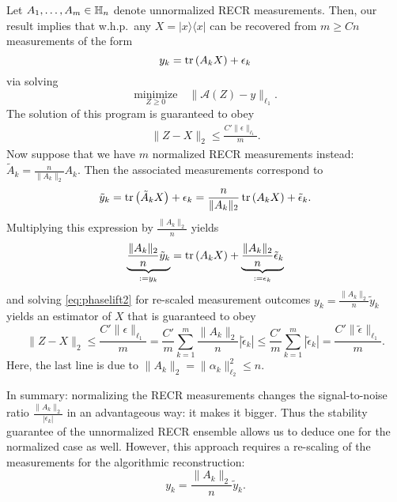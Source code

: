 Let $ A_1,\ldots, A_m \in \mathbb{H}_n$ denote unnormalized RECR measurements.
Then, our result implies that w.h.p.\ any $ X = | x \rangle \!\langle  x|$ can be recovered from $m \geq  C n$ measurements of the form
\begin{equation*}
  y_k = \operatorname{tr} \left(  A_k  X \right) + \epsilon_k
\end{equation*}
via solving
\begin{equation}
  \underset{ Z\geq 0}{\textrm{minimize}} \quad \| \mathcal{A}( Z) -  y \|_{\ell_1}. \label{eq:phaselift2}
\end{equation}
The solution of this program is guaranteed to obey
\begin{align*}
\|  Z -  X \|_2 \leq \frac{C' \| \epsilon \|_{\ell_1}}{m}.
\end{align*}
Now suppose that we have $m$ normalized RECR measurements instead: $\tilde{ A}_k = \frac{n}{\|  A_k \|_{2}}  A_k$. Then the associated measurements correspond to
\begin{equation*}
  \tilde{y}_k = \operatorname{tr} \left( \tilde{ A}_k X \right) + \epsilon_k = \frac{ n}{\|  A_k \|_2} \operatorname{tr} \left(  A_k X \right) + \tilde{\epsilon}_k.
\end{equation*}
Multiplying this expression by $\frac{\|  A_k \|_2}{n}$ yields
\begin{equation*}
\underset{:= y_k}{\underbrace{ \frac{ \|  A_k \|_2}{n}\tilde{y}_k}}
= \operatorname{tr} \left(  A_k X \right) + \underset{:= \epsilon_k}{\underbrace{ \frac{ \|  A_k \|_2}{n}\tilde{\epsilon}_k}}
\end{equation*}
and solving \eqref{eq:phaselift2} for re-scaled measurement outcomes $y_k = \frac{ \|  A_k \|_2}{n}\tilde{y}_k$ yields an estimator of $ X$ that is guaranteed to obey
\begin{equation*}
  \|  Z -  X \|_2 \leq \frac{C' \|  \epsilon \|_{\ell_1}}{m}
  = \frac{C'}{m} \sum_{k=1}^m \frac{ \|  A_k \|_2}{n} | \tilde{\epsilon}_k |
  \leq \frac{C'}{m} \sum_{k=1}^m | \tilde{\epsilon}_k| = \frac{C' \| \tilde{\epsilon} \|_{\ell_1}}{m}.
\end{equation*}
Here, the last line is due to $\|  A_k \|_2 = \| \alpha_k \|_{\ell_2}^2 \leq n$.

In summary: normalizing the RECR measurements changes the signal-to-noise ratio $\frac{ \|  A_k \|_2}{| \epsilon_k|}$ in an advantageous way: it makes it bigger. Thus the stability guarantee of the unnormalized RECR ensemble allows us to deduce one for the normalized case as well. However, this approach requires a re-scaling of the measurements for the algorithmic reconstruction:
\begin{equation*}
  y_k = \frac{ \|  A_k \|_2}{n} \tilde{y}_k.
\end{equation*}


